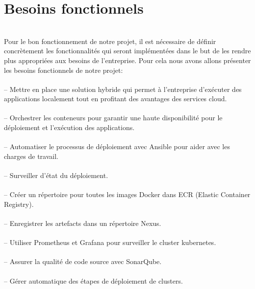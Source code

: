 \section{\LARGE Besoins fonctionnels}
\texttt{}\\[0.1cm]
\textsf{\selectfont{} Pour le bon fonctionnement de notre projet, il est nécessaire de définir  concrètement les fonctionnalités qui seront implémentées dans le but de les rendre plus appropriées aux besoins de l'entreprise.
Pour cela nous avons allons présenter les besoins fonctionnels de notre projet:\\\texttt{}\\[0.01cm]
-- Mettre en place une solution hybride qui permet à l'entreprise d'exécuter des applications localement tout en profitant des avantages des services cloud.\\\texttt{}\\[0.01cm]
– Orchestrer les conteneurs pour garantir une haute disponibilité pour le déploiement et l'exécution des applications.\\\texttt{}\\[0.01cm]
– Automatiser le processus de déploiement avec Ansible pour aider avec les charges de travail.\\\texttt{}\\[0.01cm]
– Surveiller d’état du déploiement.\\\texttt{}\\[0.01cm]
– Créer un répertoire pour toutes les images Docker dans ECR (Elastic Container Registry).\\\texttt{}\\[0.01cm]
-- Enregistrer les artefacts dans un répertoire Nexus.\\\texttt{}\\[0.01cm]
– Utiliser Prometheus et Grafana pour surveiller le cluster kubernetes.\\\texttt{}\\[0.01cm]
– Assurer la qualité de code source avec SonarQube.\\\texttt{}\\[0.01cm]
– Gérer automatique des étapes de déploiement de clusters.}


